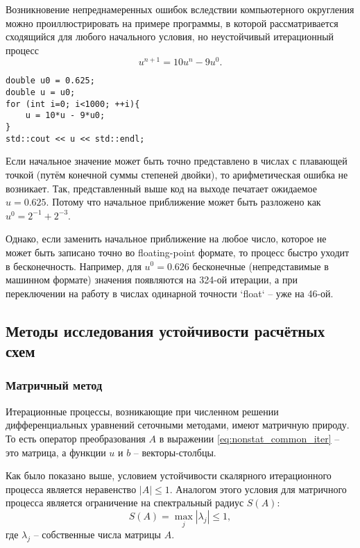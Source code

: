 Возникновение непреднамеренных ошибок вследствии компьютерного округления можно проиллюстрировать на примере
программы, в которой рассматривается сходящийся для любого начального условия, но неустойчивый итерационный процесс
\begin{equation*}
    u^{n+1} = 10 u^{n} - 9 u^{0}.
\end{equation*}

\begin{verbatim}
double u0 = 0.625;
double u = u0;
for (int i=0; i<1000; ++i){
    u = 10*u - 9*u0;
}
std::cout << u << std::endl;
\end{verbatim}

Если начальное значение может быть точно представлено в
числах с плавающей точкой (путём конечной суммы степеней двойки),
то арифметическая ошибка не возникает.
Так, представленный выше код на выходе печатает ожидаемое $u=0.625$.
Потому что начальное приближение может быть разложено как $u^0 = 2^{-1} + 2^{-3}$.

Однако, если заменить начальное приближение на любое число,
которое не может быть записано точно во floating-point формате,
то процесс быстро уходит в бесконечность.
Например, для $u^0 = 0.626$ бесконечные (непредставимые в машинном формате) значения
появляются на 324-ой итерации,
а при переключении на работу в числах одинарной точности `float` -- уже на 46-ой.

\subsection{Методы исследования устойчивости расчётных схем}
\label{sec:stability_analysis}

\subsubsection{Матричный метод}

Итерационные процессы, возникающие при численном решении
дифференциальных уравнений сеточными методами, имеют матричную природу.
То есть оператор преобразования $A$ в выражении \eqref{eq:nonstat_common_iter} -- это матрица,
а функции $u$ и $b$ -- векторы-столбцы.

Как было показано выше, условием устойчивости скалярного итерационного процесса является неравенство $|A| \leq 1$.
Аналогом этого условия для матричного процесса является ограничение на спектральный радиус $S(A)$:
\begin{equation}
    \label{eq:nonstat_spectral_radius}
    S(A) = \max_j{ | \lambda_j | } \leq 1,
\end{equation}
где $\lambda_j$ -- собственные числа матрицы $A$.

